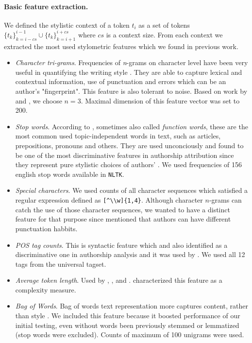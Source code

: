 \documentclass[10pt, a4paper]{article}
\begin{document}
\paragraph{Basic feature extraction.} 
We defined the stylistic context of a token $t_i$ as a set of tokens $\{t_k\}_{k=i-cs}^{i-1} \cup \{t_k\}_{k=i+1}^{i+cs}$ where $cs$ is a context size. From each context we extracted the most used stylometric features which we found in previous work.
\begin{itemize}
	\item \textit{Character tri-grams}. Frequencies of \textit{n}-grams on character level have been very useful in quantifying the writing style \citep{stamatatos-2009b}. They are able to capture lexical and contextual information, use of punctuation and errors which can be an author's  "fingerprint". This feature is also tolerant to noise. Based on work by \citet{stamatatos-2009a} and \citet{rahman-2015}, we choose $n=3$. Maximal dimension of this feature vector was set to 200.
	\item \textit{Stop words}. According to \citet{stamatatos-2009a}, sometimes also called \textit{function words}, these are the most common used topic-independent words in text, such as articles, prepositions, pronouns and others. They are used unconciously and found to be one of the most discriminative features in authorship attribution since they represent pure stylistic choices of authors' \citep{burrows-1987,argamon-2005}. We used frequencies of 156 english stop words available in \texttt{NLTK}.
	\item \textit{Special characters}. We used counts of all character sequences which satisfied a regular expression defined as \verb/[^\\w]{1,4}/. Although character $n$-grams can catch the use of those character sequences, we wanted to have a distinct feature for that purpose since \citet{koppel-2009} mentioned that authors can have different punctuation habbits.
	\item \textit{POS tag counts}. This is syntactic feature which \citet{koppel-2009} and \citet{stamatatos-2009a} also identified as a discriminative one in authorship analysis and it was used by \citet{kuznetsov-2016}. We used all 12 tags from the universal tagset.
	\item \textit{Average token length}. Used by \citet{kuznetsov-2016}, \citet{sittar-2016},  \citet{brooke-2012} and \citet{stein-2011}. \citet{koppel-2009} characterized this feature as a complexity measure.
	\item \textit{Bag of Words}. Bag of words text representation more captures content, rather than style \citep{stamatatos-2009a}. We included this feature because it boosted performance of our initial testing, even without words been previously stemmed or lemmatized (stop words were excluded). Counts of maximum of 100 unigrams were used.

\end{itemize}
\end{document}
